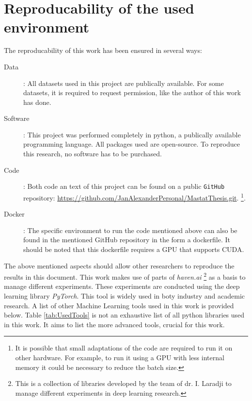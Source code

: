\section{Reproducability of the used environment}
The reproducability of this work has been ensured in several ways:
\begin{description}
  \item[Data]: All datasets used in this project are publically available. For some datasets, it is required to request permission, like the author of this work has done.
  \item[Software]: This project was performed completely in python, a publically available programming language. 
  All packages used are open-source.
  To reproduce this research, no software has to be purchased. 
  \item[Code]: Both code an text of this project can be found on a public \texttt{GitHub} repository: \url{https://github.com/JanAlexanderPersonal/MastatThesis.git}.
  \footnote{It is possible that small adaptations of the code are required to run it on other hardware. For example, to run it using a GPU with less internal memory it could be necessary to reduce the batch size.}. 
  \item[Docker]: The specific environment to run the code mentioned above can also be found in the mentioned GitHub repository in the form a dockerfile.
  It should be noted that this dockerfile requires a GPU that supports CUDA.   
\end{description}

The above mentioned aspects should allow other researchers to reproduce the results in this document.
This work makes use of parts of \textit{haven.ai} \footnote{This is a collection of libraries developed by the team of dr. I. Laradji to manage different experiments in deep learning research.} 
as a basis to manage different experiments.
These experiments are conducted using the deep learning library \textit{PyTorch}.
This tool is widely used in boty industry and academic research.
A list of other Machine Learning tools used in this work is provided below.
Table \ref{tab:UsedTools} is not an exhaustive list of all  python libraries used in this work.
It aims to list the more advanced tools, crucial for this work.

